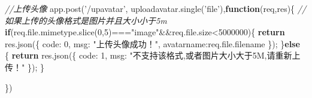 \documentclass[]{article}
\newenvironment{Shaded}{}{}
\newcommand{\AttributeTok}[1]{\textcolor[rgb]{0.49,0.56,0.16}{#1}}
\newcommand{\CommentTok}[1]{\textcolor[rgb]{0.38,0.63,0.69}{\textit{#1}}}
\newcommand{\ControlFlowTok}[1]{\textcolor[rgb]{0.00,0.44,0.13}{\textbf{#1}}}
\newcommand{\DataTypeTok}[1]{\textcolor[rgb]{0.56,0.13,0.00}{#1}}
\newcommand{\DecValTok}[1]{\textcolor[rgb]{0.25,0.63,0.44}{#1}}
\newcommand{\KeywordTok}[1]{\textcolor[rgb]{0.00,0.44,0.13}{\textbf{#1}}}
\newcommand{\NormalTok}[1]{#1}
\newcommand{\OperatorTok}[1]{\textcolor[rgb]{0.40,0.40,0.40}{#1}}
\newcommand{\StringTok}[1]{\textcolor[rgb]{0.25,0.44,0.63}{#1}}
\newcommand{\VariableTok}[1]{\textcolor[rgb]{0.10,0.09,0.49}{#1}}
\begin{document}
\begin{Shaded}
\begin{Highlighting}[]
\CommentTok{//上传头像}
\VariableTok{app}\NormalTok{.}\AttributeTok{post}\NormalTok{(}\StringTok{'/upavatar'}\OperatorTok{,} \VariableTok{uploadavatar}\NormalTok{.}\AttributeTok{single}\NormalTok{(}\StringTok{'file'}\NormalTok{)}\OperatorTok{,}\KeywordTok{function}\NormalTok{(req}\OperatorTok{,}\NormalTok{res)}\OperatorTok{\{}
	\CommentTok{//如果上传的头像格式是图片并且大小小于5m}
  \ControlFlowTok{if}\NormalTok{(}\VariableTok{req}\NormalTok{.}\VariableTok{file}\NormalTok{.}\VariableTok{mimetype}\NormalTok{.}\AttributeTok{slice}\NormalTok{(}\DecValTok{0}\OperatorTok{,}\DecValTok{5}\NormalTok{)}\OperatorTok{===}\StringTok{"image"}\OperatorTok{&&}\VariableTok{req}\NormalTok{.}\VariableTok{file}\NormalTok{.}\AttributeTok{size}\OperatorTok{<}\DecValTok{5000000}\NormalTok{)}\OperatorTok{\{}
    \ControlFlowTok{return} \VariableTok{res}\NormalTok{.}\AttributeTok{json}\NormalTok{(}\OperatorTok{\{}
      \DataTypeTok{code}\OperatorTok{:} \DecValTok{0}\OperatorTok{,}
      \DataTypeTok{msg}\OperatorTok{:} \StringTok{"上传头像成功！"}\OperatorTok{,}
      \DataTypeTok{avatarname}\OperatorTok{:}\VariableTok{req}\NormalTok{.}\VariableTok{file}\NormalTok{.}\AttributeTok{filename}
    \OperatorTok{\}}\NormalTok{)}\OperatorTok{;}
  \OperatorTok{\}}\ControlFlowTok{else} \OperatorTok{\{}
    \ControlFlowTok{return} \VariableTok{res}\NormalTok{.}\AttributeTok{json}\NormalTok{(}\OperatorTok{\{}
      \DataTypeTok{code}\OperatorTok{:} \DecValTok{1}\OperatorTok{,}
      \DataTypeTok{msg}\OperatorTok{:} \StringTok{"不支持该格式,或者图片大小大于5M,请重新上传！"}
    \OperatorTok{\}}\NormalTok{)}\OperatorTok{;}
  \OperatorTok{\}}

\OperatorTok{\}}\NormalTok{)}


\end{Highlighting}
\end{Shaded}
\end{document}
